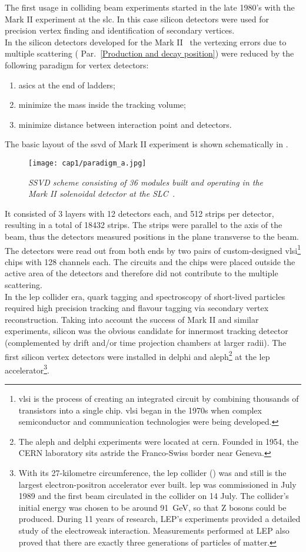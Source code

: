 \hskip 1cm The first usage in colliding beam experiments started in the late
1980's with the Mark II experiment at the \gls{slc}. In this case silicon
detectors were used for precision vertex finding and identification of secondary
vertices.\\
In the silicon detectors developed for the Mark II~\cite{Mark-II} the vertexing
errors due to multiple scattering ( Par.~\ref{Production and decay position})
were reduced by the following paradigm for vertex detectors:
\begin{enumerate}
\item \glspl{asic} at the end of ladders;
\item minimize the mass inside the tracking volume;
\item minimize distance between interaction point and detectors.
\end{enumerate}
The basic layout of the \gls{ssvd} of Mark II experiment is shown schematically
in .
\begin{figure}[!htbp]
  \centering\texttt{[image: cap1/paradigm\_a.jpg]}
  \caption{\textit{SSVD scheme consisting of 36 modules built and operating in
      the Mark II solenoidal detector at the
      SLC~\cite{Mark-II}.}}\label{paradigm_a}
\end{figure}
It consisted of 3 layers with 12 detectors each, and 512 strips per detector,
resulting in a total of 18432 strips. The strips were parallel to the axis of
the beam, thus the detectors measured positions in the plane transverse to the
beam. The detectors were read out from both ends by two pairs of custom-designed
\gls{vlsi}\footnote{ \gls{vlsi} is the process of creating an integrated circuit
  by combining thousands of transistors into a single chip. \gls{vlsi} began in
  the 1970s when complex semiconductor and communication technologies were being
  developed.}  chips with 128 channels each. The circuits and the chips were
placed outside the active area of the detectors and therefore did not
contribute to the multiple scattering.\\
In the \gls{lep} collider era, quark tagging and spectroscopy of short-lived
particles required high precision tracking and flavour tagging via secondary
vertex reconstruction. Taking into account the success of Mark II and similar
experiments, silicon was the obvious candidate for innermost tracking detector
(complemented by drift and/or time projection chambers at larger radii). The
first silicon vertex detectors were installed in \gls{delphi} and
\gls{aleph}\footnote{The \gls{aleph} and \gls{delphi} experiments were located
  at \gls{cern}. Founded in 1954, the CERN laboratory sits astride the
  Franco-Swiss border near Geneva.} at the \gls{lep} accelerator\footnote{With
  its 27-kilometre circumference, the \gls{lep} collider () was
  and still is the largest electron-positron accelerator ever built. \gls{lep}
  was commissioned in July 1989 and the first beam circulated in the collider on
  14 July. The collider's initial energy was chosen to be around 91~GeV, so that
  Z bosons could be produced. During 11 years of research, LEP's experiments
  provided a detailed study of the electroweak interaction. Measurements
  performed at LEP also proved that there are exactly three generations of
  particles of matter.}.
